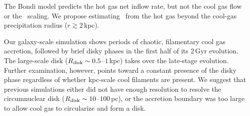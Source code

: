 The Bondi model predicts the hot gas net inflow rate, but not the cool gas flow or the \mrrelation\ scaling. We propose estimating \mdotbh\ from the hot gas beyond the cool-gas precipitation radius ($r\gtrsim 2$\,kpc).

Our galaxy-scale simulation shows periods of chaotic, filamentary cool gas accretion, followed by brief disky phases in the first half of its 2\,Gyr evolution. The large-scale disk ($R_{\rm disk}\sim 0.5$--$1$\,kpc) takes over the late-stage evolution. Further examination, however, points toward a constant presence of the disky phase regardless of whether kpc-scale cool filaments are present. We suggest that previous simulations either did not have enough resolution to resolve the circumnuclear disk ($R_{\rm disk}\sim 10$--$100$\,pc), or the accretion boundary was too large to allow cool gas to circularize and form a disk.
